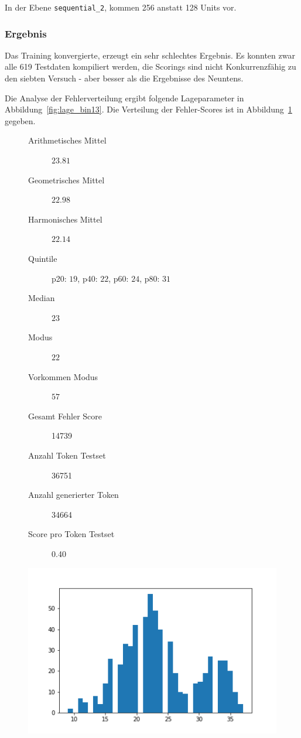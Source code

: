 \documentclass[pdftex,a4paper,halfparskip, article]{scrartcl}
\begin{document}
In der Ebene \texttt{sequential\_2}, kommen 256 anstatt 128 Units vor.

\subsubsection*{Ergebnis}

Das Training konvergierte, erzeugt ein sehr schlechtes Ergebnis. Es konnten zwar alle 619 Testdaten kompiliert werden, die Scorings sind nicht Konkurrenzfähig zu den siebten Versuch - aber besser als die Ergebnisse des Neuntens.

Die Analyse der Fehlerverteilung ergibt folgende Lageparameter in Abbildung~\ref{fig:lage_bin13}. Die Verteilung der Fehler-Scores ist in Abbildung~\ref{fig:hist_bin13} gegeben.

\begin{figure}
\centering
\begin{minipage}{.5\textwidth}
  \centering
  \begin{description}
	\item[Arithmetisches Mittel] $23.81$	
	\item[Geometrisches Mittel] $22.98$
	\item[Harmonisches Mittel] $22.14$
	\item[Quintile] p20: $19$, p40: $22$, p60: $24$, p80: $31$
	\item[Median] $23$
	\item[Modus] $22$
	\item[Vorkommen Modus] $57$
	\item[Gesamt Fehler Score] 14739
	\item[Anzahl Token Testset] 36751 
	\item[Anzahl generierter Token] 34664
	\item[Score pro Token Testset]  0.40
\end{description}
  \label{fig:lage_bin13}
\end{minipage}%
\begin{minipage}{.5\textwidth}
  \centering
  \includegraphics[width=1\linewidth]{predictions_bin13_histogramm}
  \label{fig:hist_bin13}
\end{minipage}
\end{figure}
\end{document}

